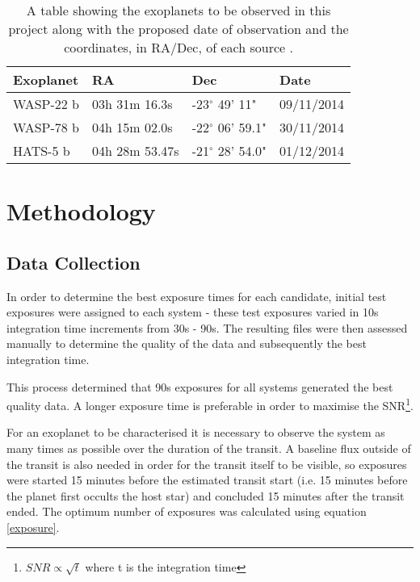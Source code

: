 \documentclass{article}
\begin{document}
\begin{table}
    \centering
    \begin{tabular}{ | l | l | l | l | }
    \hline \hline
    Exoplanet & RA & Dec & Date       \\ \hline \hline
    WASP-22 b    & 03h 31m 16.3s & -23$^\circ$ 49' 11" & 09/11/2014 \\
    WASP-78 b   & 04h 15m 02.0s & -22$^\circ$ 06' 59.1" & 30/11/2014 \\
    HATS-5 b  & 04h 28m 53.47s & -21$^\circ$ 28' 54.0" & 01/12/2014 \\
    \hline
    \end{tabular}
    \caption{A table showing the exoplanets to be observed in this project along with the proposed date of observation and the coordinates, in RA/Dec, of each source \parencite{etd}.}
    \label{planets}
\end{table}


\section{Methodology}
\subsection{Data Collection}
In order to determine the best exposure times for each candidate, initial test exposures
were assigned to each system - these test exposures varied in 10s integration time
increments from 30s - 90s. The resulting files were then assessed manually to determine
the quality of the data and subsequently the best integration time.

This process determined that 90s exposures for all systems generated the best quality
data. A longer exposure time is preferable in order to maximise the SNR\footnote{$SNR 
\propto \sqrt{t}$ where t is the integration time}. 

For an exoplanet to be characterised it is necessary to observe the system as many times as possible over the duration of the transit. A baseline flux outside of the transit is also needed in order for the transit itself to be visible, so exposures were started 15 minutes before the estimated transit start (i.e. 15 minutes before the planet first occults the host star) and concluded 15 minutes after the transit ended. The optimum number of exposures was calculated using equation \ref{exposure}. 
\end{document}
